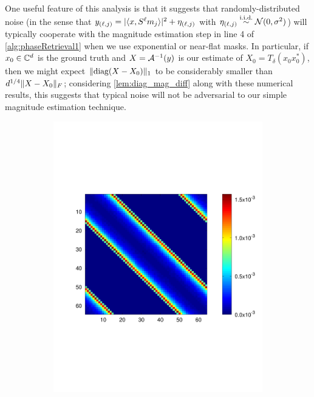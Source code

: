 One useful feature of this analysis is that it suggests that randomly-distributed noise (in the sense that $y_{(\ell, j)} = \lvert\langle x, S^\ell m_j\rangle\rvert^2 + \eta_{(\ell, j)}$ with $\eta_{(\ell, j)} \overset{\text{i.i.d.}}{\sim} \mathcal{N}(0, \sigma^2)$) will typically cooperate with the magnitude estimation step in line 4 of \cref{alg:phaseRetrieval1} when we use exponential or near-flat masks.  In particular, if $x_0 \in \mathbb{C}^d$ is the ground truth and $X = \mathcal{A}^{-1}(y)$ is our estimate of $X_0 = T_\delta(x_0 x_0^*)$, then we might expect $\lVert\operatorname{diag}(X - X_0)\rVert_1$ to be considerably smaller than $d^{1 / 4} \lVert X - X_0\rVert_F$; considering \cref{lem:diag_mag_diff} along with these numerical results, this suggests that typical noise will not be adversarial to our simple magnitude estimation technique.

\begin{figure}
  \centering
  \begin{subfigure}[b]{.49\textwidth}
    \centering
    \includegraphics[width=\textwidth,trim={.4in 2.5in .8in 2.5in}]{figs/expvar512}

\end{subfigure}
\end{figure}
